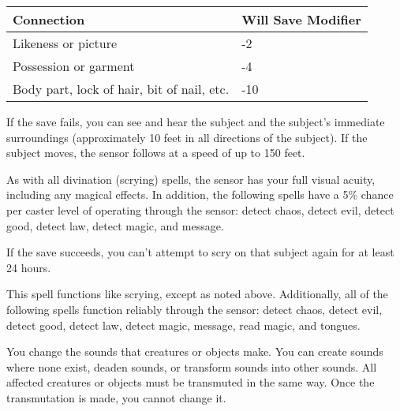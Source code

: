 \begin{multicols}{2}
\begin{small}
\vspace*{8pt}

\begin{center}
\begin{tabular}[h!]{p{1.75in}|p{1in}}
Connection & Will Save Modifier \\ \hline
Likeness or picture &	-2 \\
Possession or garment & -4 \\
Body part, lock of hair, bit of nail, etc. & -10 \\
\end{tabular}
\end{center}

\smallskip\noindent If the save fails, you can see and hear the subject and the subject's immediate surroundings (approximately 10 feet in all directions of the subject). If the subject moves, the sensor follows at a speed of up to 150 feet.

\smallskip\noindent As with all divination (scrying) spells, the sensor has your full visual acuity, including any magical effects. In addition, the following spells have a 5\% chance per caster level of operating through the sensor: detect chaos, detect evil, detect good, detect law, detect magic, and message.

\smallskip\noindent If the save succeeds, you can't attempt to scry on that subject again for at least 24 hours.


\noindent This spell functions like scrying, except as noted above. Additionally, all of the following spells function reliably through the sensor: detect chaos, detect evil, detect good, detect law, detect magic, message, read magic, and tongues.

\noindent You change the sounds that creatures or objects make. You can create sounds where none exist, deaden sounds, or transform sounds into other sounds. All affected creatures or objects must be transmuted in the same way. Once the transmutation is made, you cannot change it.


\end{small}
\end{multicols}
